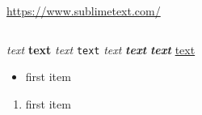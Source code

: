 \documentclass[12pt]{article}
\begin{document}
\cite[\command]{my:bib:key}
%



\url{https://www.sublimetext.com/}

\href{https://www.sublimetext.com/}











\inputminted{py}{path/to/file.py}



\emph{text}
\textbf{text}
\textit{text}
\texttt{text}
\textsl{text}
\textbf{\textit{text}}
\textit{\textbf{text}}
\underline{text}



\begin{itemize}
\item first item
\end{itemize}

\begin{enumerate}
\item first item
\end{enumerate}
\end{document}
